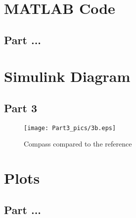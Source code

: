 
\appendix

\section{MATLAB Code} \label{sec:matlab_code}
\subsection{Part ...}


\newpage
\section{Simulink Diagram} \label{sec:simulink_diagrams}
\subsection{Part 3}\label{sec:simulink_diagrams_3}
\begin{figure}[H]
    \centering
    \texttt{[image: Part3\_pics/3b.eps]}
    \caption{Compass compared to the reference}
    \label{sim:5.3.b}
\end{figure}


\newpage
\section{Plots}
\subsection{Part ...}